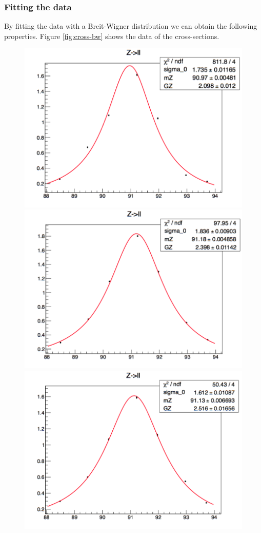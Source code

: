 \documentclass[]{article}
\begin{document}
\subsubsection{Fitting the data}
By fitting the data with a Breit-Wigner distribution we can obtain the following properties. Figure \ref{fig:cross-bw} shows the data of the cross-sections.
\begin{figure}[H]
	\centering
	\includegraphics[scale=0.25]{z-ee}
	\includegraphics[scale=0.25]{z-mm}
	\includegraphics[scale=0.25]{z-tt}

\end{figure}
\end{document}
